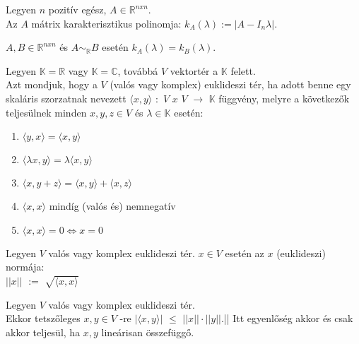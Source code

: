 \begin{frame}
		\begin{tcolorbox}[title={Def.: Karakterisztikus polinom}]
			Legyen $n$ pozitív egész, $A \in \mathbb{R}^{n x n}$.\\
			Az $A$ mátrix karakterisztikus polinomja: $k_A({\lambda}) := |A - I_n{\lambda}|$.
		\end{tcolorbox}	
		
		\begin{tcolorbox}[title={Tétel: Karakterisztikus polinom, hasonlóság}]
 			$A, B \in \mathbb{R}^{n x n}$ és $A {\sim}_\mathbb{R} B$ esetén $k_A({\lambda}) = k_B({\lambda})$.
		\end{tcolorbox}	
	\end{frame}
	
	\begin{frame}
		\begin{tcolorbox}[title={Def.: Euklideszi tér, Skaláris szorzat}]
 			Legyen $\mathbb{K} = \mathbb{R}$ vagy $\mathbb{K} = \mathbb{C}$, továbbá $V$ vektortér a $\mathbb{K}$ felett.\\
 			Azt mondjuk, hogy a $V$ (valós vagy komplex) euklideszi tér, ha adott benne egy skaláris szorzatnak nevezett ${\langle}x, y{\rangle}$ $:$ $V$ $x$ $V$ $\rightarrow$ $\mathbb{K}$ függvény, melyre a következők teljesülnek minden $x, y, z \in V$ és $\lambda \in \mathbb{K}$ esetén:

			\begin{enumerate}
			\item ${\langle}y, x{\rangle} = {\langle}x, y{\rangle}$
			\item ${\langle}{\lambda}x, y{\rangle} = {\lambda}{\langle}x, y{\rangle}$
			\item ${\langle}x, y + z{\rangle} = {\langle}x, y{\rangle} + {\langle}x, z{\rangle}$
			\item ${\langle}x, x{\rangle}$ mindíg (valós és) nemnegatív
			\item ${\langle}x, x{\rangle} = 0  \iff  x = 0$
			\end{enumerate}
		\end{tcolorbox}	
		
		\begin{tcolorbox}[title={Def.: Norma}]
 			Legyen $V$ valós vagy komplex euklideszi tér. $x \in V$ esetén az $x$ (euklideszi) normája:\\
 			$||x||$ $:=$ $\sqrt{{\langle}x, x{\rangle}}$
		\end{tcolorbox}	
		
		\begin{tcolorbox}[title={Tétel: Cauchy-egyenlőtlenség}]
 			Legyen $V$ valós vagy komplex euklideszi tér.\\
 			Ekkor tetszőleges $x, y \in V$ -re $|{\langle}x, y{\rangle}|$ $\leq$ $||x|| \cdot ||y||$.||
 			Itt egyenlőség akkor és csak akkor teljesül, ha $x, y$ lineárisan összefüggő.
		\end{tcolorbox}	
	\end{frame}
	
